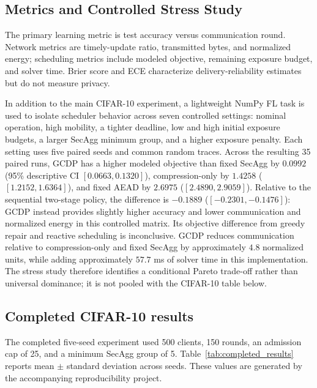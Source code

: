 \documentclass[preprint,12pt]{elsarticle}
\begin{document}
\subsection{Metrics and Controlled Stress Study}

The primary learning metric is test accuracy versus communication round. Network metrics are timely-update ratio, transmitted bytes, and normalized energy; scheduling metrics include modeled objective, remaining exposure budget, and solver time. Brier score and ECE characterize delivery-reliability estimates but do not measure privacy.

In addition to the main CIFAR-10 experiment, a lightweight NumPy FL task is used to isolate scheduler behavior across seven controlled settings: nominal operation, high mobility, a tighter deadline, low and high initial exposure budgets, a larger SecAgg minimum group, and a higher exposure penalty. Each setting uses five paired seeds and common random traces. Across the resulting 35 paired runs, GCDP has a higher modeled objective than fixed SecAgg by $0.0992$ (95\% descriptive CI $[0.0663,0.1320]$), compression-only by $1.4258$ ($[1.2152,1.6364]$), and fixed AEAD by $2.6975$ ($[2.4890,2.9059]$). Relative to the sequential two-stage policy, the difference is $-0.1889$ ($[-0.2301,-0.1476]$): GCDP instead provides slightly higher accuracy and lower communication and normalized energy in this controlled matrix. Its objective difference from greedy repair and reactive scheduling is inconclusive. GCDP reduces communication relative to compression-only and fixed SecAgg by approximately $4.8$ normalized units, while adding approximately $57.7$ ms of solver time in this implementation. The stress study therefore identifies a conditional Pareto trade-off rather than universal dominance; it is not pooled with the CIFAR-10 table below.

\subsection{Completed CIFAR-10 results}
The completed five-seed experiment used 500 clients, 150 rounds, an admission cap of 25, and a minimum SecAgg group of 5. Table~\ref{tab:completed_results} reports mean $\pm$ standard deviation across seeds. These values are generated by the accompanying reproducibility project.
\end{document}
